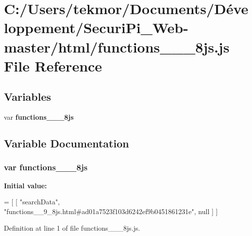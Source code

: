 \section{C\+:/\+Users/tekmor/\+Documents/\+Développement/\+Securi\+Pi\+\_\+\+Web-\/master/html/functions\+\_\+\+\_\+\_\+8js.js File Reference}
\label{functions____9__8js_8js}
\subsection*{Variables}
\begin{DoxyCompactItemize}
\item 
var {\bf functions\+\_\+\+\_\+\_\+8js}
\end{DoxyCompactItemize}


\subsection{Variable Documentation}
\subsubsection[{functions\+\_\+\+\_\+9\+\_\+8js}]{\setlength{\rightskip}{0pt plus 5cm}var functions\+\_\+\+\_\+\_\+8js}\label{functions____9__8js_8js_a02ff7f7c22879f7fc595fd9c9d541853}
{\bfseries Initial value\+:}
\begin{DoxyCode}
=
[
    [ \textcolor{stringliteral}{"searchData"}, \textcolor{stringliteral}{"functions\_\_9\_8js.html#ad01a7523f103d6242ef9b0451861231e"}, null ]
]
\end{DoxyCode}


Definition at line 1 of file functions\+\_\+\+\_\+\_\+8js.\+js.

